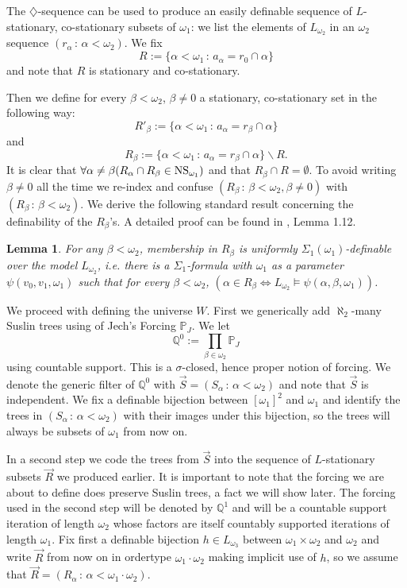 \documentclass[a4paper,11pt]{article}
\newtheorem{lemma}[theorem]{Lemma}
\newcommand{\forceP}{\mathbb{P}}
\newcommand{\forceQ}{\mathbb{Q}}
\begin{document}
The $\diamondsuit$-sequence can be used to produce an easily definable sequence of $L$-stationary, co-stationary subsets of $\omega_1$: we list the elements of $L_{\omega_2}$ in an $\omega_2$ sequence $(r_{\alpha} \, : \, \alpha < \omega_2)$. 
We fix \[R:= \{\alpha < \omega_1 \, : \, a_{\alpha}= r_0 \cap \alpha \} \] and note that $R$ is stationary and co-stationary. 

Then we define for every $\beta < \omega_2$, $\beta \ne 0$
a stationary, co-stationary set in the following way:
\[R'_{\beta} := \{ \alpha < \omega_1 \, : \, a_{\alpha}= {r}_{\beta} \cap \alpha \}\]
and 
\[R_{\beta} := \{ \alpha < \omega_1 \, : \, a_{\alpha}= {r}_{\beta} \cap \alpha \} \backslash R.\]
 It is clear that $\forall \alpha \ne \beta (R_{\alpha} \cap R_{\beta} \in \hbox{NS}_{\omega_1})$ and that $R_{\beta} \cap R=\emptyset$. 
To avoid writing $\beta \ne 0$ all the time we re-index and confuse $(R_{\beta} \, : \, \beta < \omega_2, \beta \ne 0)$ with $(R_{\beta} \, : \, \beta < \omega_2)$.
We derive the following standard result concerning the definability of the $R_{\beta}$'s. A detailed proof can be found in \cite{Ho1}, Lemma 1.12.
\begin{lemma}\label{computationofRbetas}
For any $\beta < \omega_2$, membership in $R_{\beta}$ is uniformly $\Sigma_1(\omega_1)$-definable over the model $L_{\omega_2}$, i.e. there is a $\Sigma_1$-formula with $\omega_1$ as a parameter $\psi(v_0,v_1, \omega_1)$ such that for every $\beta < \omega_2$,
$(\alpha \in R_{\beta} \Leftrightarrow L_{\omega_2} \models \psi(\alpha, \beta,\omega_1))$. 
\end{lemma}


We proceed with defining the universe $W$.
First we generically add $\aleph_2$-many Suslin trees using of Jech's Forcing $ \forceP_J$. We let 
\[\forceQ^0 := \prod_{\beta \in \omega_2} \forceP_J \] using countable support. This is a $\sigma$-closed, hence proper notion of forcing. We denote the generic filter of $\forceQ^0$ with $\vec{S}=(S_{\alpha} \, : \, \alpha < \omega_2)$ and note that $\vec{S}$ is independent.  We fix a definable bijection between {$[\omega_1]^{2}$ and $\omega_1$} and identify the trees in {$(S_{\alpha }\, : \, \alpha < \omega_2)$} with their images under this bijection, so the trees will always be subsets of $\omega_1$ from now on. 


In a second step we code the trees from $\vec{S}$ into the sequence of $L$-stationary subsets $\vec{R}$ we produced earlier. It is important to note that the forcing we are about to define does preserve Suslin trees, a fact we will show later.
The forcing used in the second step will be denoted by $\mathbb{Q}^1$ and will be a countable support iteration of length {$\omega_2$} whose factors are itself countably supported iterations of length $\omega_1$. Fix first a definable bijection $h \in L_{\omega_3}$ between $\omega_1 \times \omega_2$ and $\omega_2$ and write $\vec{R}$ from now on in ordertype $\omega_1 \cdot \omega_2$ making implicit use of $h$, so we assume that $\vec{R}= (R_{\alpha} \, : \, \alpha < \omega_1 \cdot \omega_2)$. 
\end{document}
